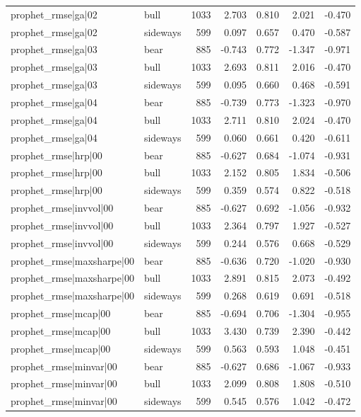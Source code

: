 \begin{table}
\begin{tabular}{llrrrrr}
prophet\_rmse|ga|02 & bull & 1033 & 2.703 & 0.810 & 2.021 & -0.470 \\
prophet\_rmse|ga|02 & sideways & 599 & 0.097 & 0.657 & 0.470 & -0.587 \\
prophet\_rmse|ga|03 & bear & 885 & -0.743 & 0.772 & -1.347 & -0.971 \\
prophet\_rmse|ga|03 & bull & 1033 & 2.693 & 0.811 & 2.016 & -0.470 \\
prophet\_rmse|ga|03 & sideways & 599 & 0.095 & 0.660 & 0.468 & -0.591 \\
prophet\_rmse|ga|04 & bear & 885 & -0.739 & 0.773 & -1.323 & -0.970 \\
prophet\_rmse|ga|04 & bull & 1033 & 2.711 & 0.810 & 2.024 & -0.470 \\
prophet\_rmse|ga|04 & sideways & 599 & 0.060 & 0.661 & 0.420 & -0.611 \\
prophet\_rmse|hrp|00 & bear & 885 & -0.627 & 0.684 & -1.074 & -0.931 \\
prophet\_rmse|hrp|00 & bull & 1033 & 2.152 & 0.805 & 1.834 & -0.506 \\
prophet\_rmse|hrp|00 & sideways & 599 & 0.359 & 0.574 & 0.822 & -0.518 \\
prophet\_rmse|invvol|00 & bear & 885 & -0.627 & 0.692 & -1.056 & -0.932 \\
prophet\_rmse|invvol|00 & bull & 1033 & 2.364 & 0.797 & 1.927 & -0.527 \\
prophet\_rmse|invvol|00 & sideways & 599 & 0.244 & 0.576 & 0.668 & -0.529 \\
prophet\_rmse|maxsharpe|00 & bear & 885 & -0.636 & 0.720 & -1.020 & -0.930 \\
prophet\_rmse|maxsharpe|00 & bull & 1033 & 2.891 & 0.815 & 2.073 & -0.492 \\
prophet\_rmse|maxsharpe|00 & sideways & 599 & 0.268 & 0.619 & 0.691 & -0.518 \\
prophet\_rmse|mcap|00 & bear & 885 & -0.694 & 0.706 & -1.304 & -0.955 \\
prophet\_rmse|mcap|00 & bull & 1033 & 3.430 & 0.739 & 2.390 & -0.442 \\
prophet\_rmse|mcap|00 & sideways & 599 & 0.563 & 0.593 & 1.048 & -0.451 \\
prophet\_rmse|minvar|00 & bear & 885 & -0.627 & 0.686 & -1.067 & -0.933 \\
prophet\_rmse|minvar|00 & bull & 1033 & 2.099 & 0.808 & 1.808 & -0.510 \\
prophet\_rmse|minvar|00 & sideways & 599 & 0.545 & 0.576 & 1.042 & -0.472 \\

\end{tabular}
\end{table}

